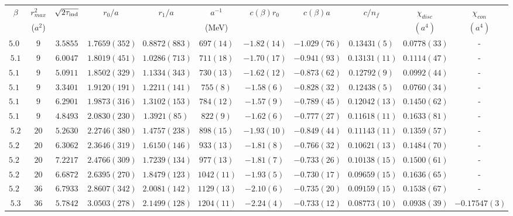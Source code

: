 \begin{table}
\begin{center}
\begin{tabular}{c|c|c|c|c|c|c|c|c|c|c}
    \hline    
$\beta$ & $r^2_{max}$ & $\sqrt{2\tau_{\rm ind}}$ & $r_0/a$ & $r_1/a$ & $a^{-1}$ & $c(\beta)r_0$ & $c(\beta)a$ & $c/n_f$ & $\chi_{disc}$ & $\chi_{con}$\\
& ($a^2$) & & & & (MeV) & & & & $(a^4)$ & $(a^4)$\\
\hline
$5.08$ & $9$ & $3.5855$ & $1.7659(352)$ & $0.8872(883)$ & $697(14)$ & $-1.82(14)$ & $-1.029(76)$ & $0.13431(5)$ & $0.0778(33)$ & - \\
\hline
$5.1$  & $9$ & $6.0047$ & $1.8019(451)$ & $1.0286(713)$ & $711(18)$ & $-1.70(17)$ & $-0.941(93)$ & $0.13131(11)$ & $0.1114(47)$ & - \\
\hline
$5.12$ & $9$ & $5.0911$ & $1.8502(329)$ & $1.1334(343)$ & $730(13)$ & $-1.62(12)$ & $-0.873(62)$ & $0.12792(9)$ & $0.0992(44)$ & - \\
\hline
$5.14$ & $9$ & $3.3401$ & $1.9120(191)$ & $1.2211(141)$ & $755(8)$ & $-1.58(6)$ & $-0.828(32)$ & $0.12438(5)$ & $0.0760(34)$ & - \\
\hline
$5.16$ & $9$ & $6.2901$ & $1.9873(316)$ & $1.3102(153)$ & $784(12)$ & $-1.57(9)$ & $-0.789(45)$ & $0.12042(13)$ & $0.1450(62)$ & - \\
\hline
$5.18$ & $9$ & $4.8493$ & $2.0830(230)$ & $1.3921(85)$ & $822(9)$ & $-1.62(6)$ & $-0.777(27)$ & $0.11618(11)$ & $0.1633(81)$ & - \\
\hline
$5.2$  & $20$ & $5.2630$ & $2.2746(380)$ & $1.4757(238)$ & $898(15)$ & $-1.93(10)$ & $-0.849(44)$ & $0.11143(11)$ & $0.1359(57)$ & - \\
\hline
$5.22$ & $20$ & $6.3062$ & $2.3646(319)$ & $1.6150(146)$ & $933(13)$ & $-1.81(8)$ & $-0.766(32)$ & $0.10621(13)$ & $0.1484(70)$ & - \\
\hline
$5.24$ & $20$ & $7.2217$ & $2.4766(309)$ & $1.7239(134)$ & $977(13)$ & $-1.81(7)$ & $-0.733(26)$ & $0.10138(15)$ & $0.1500(61)$ & - \\
\hline
$5.26$ & $20$ & $6.6872$ & $2.6395(270)$ & $1.8479(123)$ & $1042(11)$ & $-1.93(5)$ & $-0.730(17)$ & $0.09659(15)$ & $0.1636(65)$ & - \\
\hline
$5.28$ & $36$ & $6.7933$ & $2.8607(342)$ & $2.0081(142)$ & $1129(13)$ & $-2.10(6)$ & $-0.735(20)$ & $0.09159(15)$ & $0.1538(67)$ & - \\
\hline
$5.3$  & $36$ & $5.7842$ & $3.0503(278)$ & $2.1499(128)$ & $1204(11)$ & $-2.24(4)$ & $-0.733(12)$ & $0.08773(10)$ & $0.0938(39)$ & $-0.17547(3)$ \\

\end{tabular}
\end{center}
\end{table}
